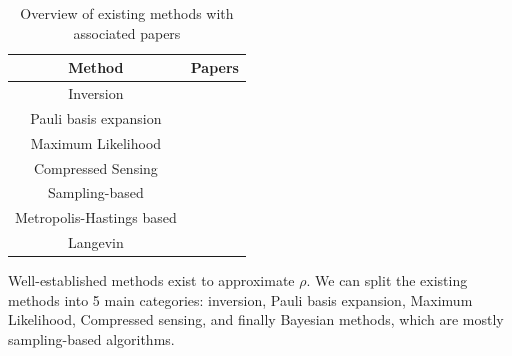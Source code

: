 \documentclass[12pt]{memoir}
\begin{document}
\begin{table}[H]


\begin{center}

    \begin{tabular}{|c|c|}

        \hline

        Method & Papers \\\hline\hline

        Inversion & \cite{meth:linear-inversion:vogel-risken, meth:linear-inversion:RMH, meth:linear-inversion:alquier} \\\hline

        Pauli basis expansion & \cite{Cai-2016}\\\hline

        Maximum Likelihood & \cite{Guta20,meth:ML:BDP,meth:ML:JKMW,meth:ML:Lvovsky,meth:ML:Blume-Kohout,meth:ML:Suzuki,meth:ML:Hradil2004} \\\hline

        Compressed Sensing & \cite{meth:CS:GLFSBE10,meth:CS:Gross-2011, meth:CS:Flammia-2012,meth:CS:Koltchinskii-2011}\\\hline

        Sampling-based & \cite{meth:bayesian:smc:Ferrie-2014,meth:bayesian:smc:Kueng-2015, meth:bayesian:smc:Granade_2016,meth:bayesian:sis:Kravtsov-2013}\\\hline

        Metropolis-Hastings based & \cite{MA17,Mai22,LLJL20, meth:bayesian:mh:Cotter2013, meth:bayesian:mh:Blume-Kohout-2010}\\\hline

        Langevin & \cite{meth:bayesian:Langevin:ACMT2024}\\\hline

    \end{tabular}

\end{center}

\caption{Overview of existing methods with associated papers}

\label{table:methods-comp}

\end{table}



Well-established methods exist to approximate $\rho$. We can split the existing methods into 5 main categories: inversion, Pauli basis expansion, Maximum Likelihood, Compressed sensing, and finally Bayesian methods, which are mostly sampling-based algorithms.\medbreak
\end{document}

